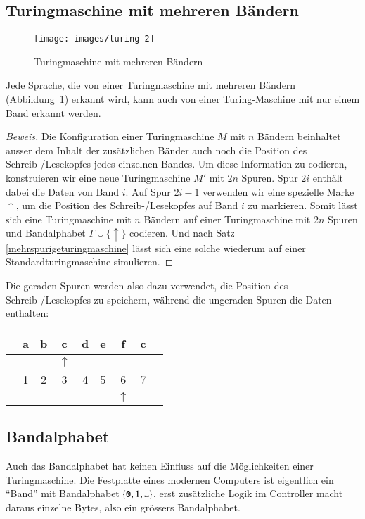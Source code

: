 \subsection{Turingmaschine mit mehreren Bändern}
%
\begin{figure}
\begin{center}
\texttt{[image: images/turing-2]}
\end{center}
\caption{Turingmaschine mit mehreren Bändern\label{multitapetm}}
\end{figure}
\begin{satz}
\label{mehrbandturingmaschine}
Jede Sprache, die von einer Turingmaschine mit mehreren Bändern
(Abbildung~\ref{multitapetm})
erkannt
wird, kann auch von einer Turing-Maschine mit nur einem Band erkannt
werden.
\end{satz}

\begin{proof}[Beweis]
Die Konfiguration einer Turingmaschine $M$ mit $n$ Bändern beinhaltet
ausser dem Inhalt der zusätzlichen Bänder auch noch die Position
des Schreib-/Lesekopfes jedes einzelnen Bandes. Um diese Information
zu codieren, konstruieren wir eine neue Turingmaschine $M'$ mit
$2n$ Spuren. Spur $2i$ enthält dabei die Daten von Band $i$.
Auf Spur $2i-1$ verwenden wir eine spezielle Marke $\uparrow$, um die Position
des Schreib-/Lesekopfes auf Band $i$ zu markieren. Somit lässt sich
eine Turingmaschine mit $n$ Bändern auf einer Turingmaschine mit
$2n$ Spuren und Bandalphabet $\Gamma\cup\{\uparrow\}$ codieren.
Und nach Satz \ref{mehrspurigeturingmaschine} lässt sich eine solche wiederum
auf einer Standardturingmaschine simulieren.
\end{proof}
Die geraden Spuren werden also dazu verwendet, die Position des
Schreib-/Lesekopfes zu speichern, während die ungeraden Spuren
die Daten enthalten:
\begin{center}
\begin{tabular}{c|c|c|c|c|c|c|c|c}
\hline
&a&b&c&d&e&f&c&\\
\hline
& & &$\uparrow$& & & & &\\
\hline
&1&2&3&4&5&6&7&\\
\hline
& & & & & &$\uparrow$& &\\
\hline
\end{tabular}
\end{center}

\subsection{Bandalphabet}
Auch das Bandalphabet hat keinen Einfluss auf die Möglichkeiten einer
Turingmaschine. Die Festplatte eines modernen Computers ist eigentlich
ein ``Band'' mit Bandalphabet $\{\texttt{0},1,\blank\}$, erst zusätzliche
Logik im Controller macht daraus einzelne Bytes, also ein grössers
Bandalphabet.

